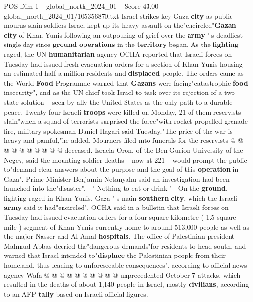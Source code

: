 \begin{textsample}{POS Dim 1 – global\_north\_2024\_01 – Score 43.00 – global\_north\_2024\_01/105356870.txt}  \label{ex:f1_pos_156}
Israel strikes key Gaza \textbf{city} as public mourns slain soldiers Israel kept up its heavy assault on the"encircled"\textbf{Gazan} \textbf{city} of Khan Yunis following an outpouring of grief over the \textbf{army} ' s deadliest single day since \textbf{ground} \textbf{operations} in the \textbf{territory} began.
As the \textbf{fighting} raged, the UN \textbf{humanitarian} agency OCHA reported that Israeli forces on Tuesday had issued fresh evacuation orders for a section of Khan Yunis housing an estimated half a million residents and \textbf{displaced} people.
The orders came as the World \textbf{Food} Programme warned that \textbf{Gazans} were facing"catastrophic \textbf{food} insecurity", and as the UN chief took Israel to task over its rejection of a two-state solution -- seen by ally the United States as the only path to a durable peace.
Twenty-four Israeli \textbf{troops} were killed on Monday, 21 of them reservists slain"when a squad of terrorists surprised the force"with rocket-propelled grenade fire, military spokesman Daniel Hagari said Tuesday."The price of the war is heavy and painful,"he added.
Mourners filed into funerals for the reservists @ @ @ @ @ @ @ @ @ @ deceased.
Israela Oron, of the Ben-Gurion University of the Negev, said the mounting soldier deaths -- now at 221 -- would prompt the public to"demand clear answers about the purpose and the goal of this \textbf{operation} in Gaza".
Prime Minister Benjamin Netanyahu said an investigation had been launched into the"disaster". - ' Nothing to eat or drink ' - On the \textbf{ground}, fighting raged in Khan Yunis, Gaza ' s main \textbf{southern} \textbf{city}, which the Israeli \textbf{army} said it had"encircled".
OCHA said in a bulletin that Israeli forces on Tuesday had issued evacuation orders for a four-square-kilometre ( 1.5-square-mile ) segment of Khan Yunis currently home to around 513,000 people as well as the major Nasser and Al-Amal \textbf{hospitals}.
The office of Palestinian president Mahmud Abbas decried the"dangerous demands"for residents to head south, and warned that Israel intended to"\textbf{displace} the Palestinian people from their homeland, thus leading to unforeseeable consequences", according to official news agency Wafa @ @ @ @ @ @ @ @ @ @ unprecedented October 7 attacks, which resulted in the deaths of about 1,140 people in Israel, mostly \textbf{civilians}, according to an AFP \textbf{tally} based on Israeli official figures.

\end{textsample}
